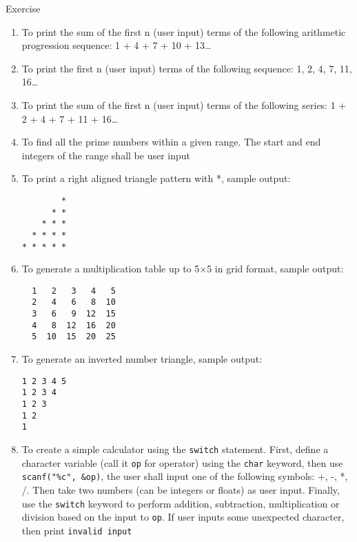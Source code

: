 \documentclass[12pt, aspectratio=169]{beamer}
\begin{document}
\begin{frame}{Exercise}
\begin{enumerate}
            \item To print the sum of the first n (user input) terms of the following arithmetic progression sequence: 1 + 4 + 7 + 10 + 13\dots
            \item To print the first n (user input) terms of the following sequence: 1, 2, 4, 7, 11, 16\dots
            \item To print the sum of the first n (user input) terms of the following series: 1 + 2 + 4 + 7 + 11 + 16\dots
            \item To find all the prime numbers within a given range. The start and end integers of the range shall be user input
            \item To print a right aligned triangle pattern with *, sample output:
            \begin{verbatim}
        *
      * *
    * * *
  * * * *
* * * * *
            \end{verbatim}

            \framebreak

            \item To generate a multiplication table up to 5×5 in grid format, sample output:
            \begin{verbatim}
  1   2   3   4   5
  2   4   6   8  10
  3   6   9  12  15
  4   8  12  16  20
  5  10  15  20  25
            \end{verbatim}

            \framebreak

            \item To generate an inverted number triangle, sample output:
            \begin{verbatim}
1 2 3 4 5
1 2 3 4
1 2 3
1 2
1
            \end{verbatim}

            \framebreak

            \item To create a simple calculator using the \texttt{switch} statement. First, define a character variable (call it \texttt{op} for operator) using the \texttt{char} keyword, then use \texttt{scanf("\%c", \&op)}, the user shall input one of the following symbols: +, -, *, /. Then take two numbers (can be integers or floats) as user input. Finally, use the \texttt{switch} keyword to perform addition, subtraction, multiplication or division based on the input to \texttt{op}. If user inputs some unexpected character, then print \texttt{invalid input}
        \end{enumerate}
    \end{frame}
\end{document}
